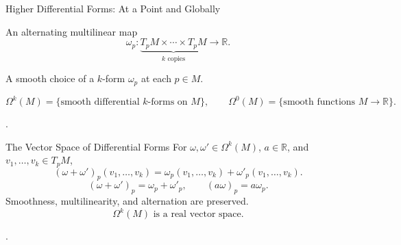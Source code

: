\documentclass[aspectratio=169,11pt]{beamer}
\newcommand{\sources}[1]{\par\vfill{\scriptsize\color{black!75}#1\par}}
\begin{document}
\begin{frame}{Higher Differential Forms: At a Point and Globally}
  \begin{definition}
    An alternating multilinear map
    \begin{equation}
      \omega_p\colon
      \underbrace{T_pM\times\cdots\times T_pM}_{k\text{ copies}}
      \longrightarrow\mathbb{R}.
    \end{equation}
  \end{definition}
  \begin{definition}
    A smooth choice of a $k$-form $\omega_p$ at each $p\in M$.
  \end{definition}
  \begin{equation}
    \Omega^k(M)=\{\text{smooth differential }k\text{-forms on }M\},
    \qquad \Omega^0(M)=\{\text{smooth functions }M\to\mathbb{R}\}.
  \end{equation}
  \sources{\cite[``Differential Forms on Manifolds,'' pp.~359--360]{lee2013smooth}.}
\end{frame}

\begin{frame}{The Vector Space of Differential Forms}
  For $\omega,\omega'\in\Omega^k(M)$, $a\in\mathbb{R}$, and
  $v_1,\ldots,v_k\in T_pM$,
  \begin{equation}
    (\omega+\omega')_p(v_1,\ldots,v_k)
    =\omega_p(v_1,\ldots,v_k)+\omega'_p(v_1,\ldots,v_k).
  \end{equation}
  \begin{equation}
    (\omega+\omega')_p=\omega_p+\omega'_p,
    \qquad (a\omega)_p=a\omega_p.
  \end{equation}
  Smoothness, multilinearity, and alternation are preserved.
  \begin{equation}
    \Omega^k(M)\text{ is a real vector space}.
  \end{equation}
  \sources{\cite[p.~360]{lee2013smooth}.}
\end{frame}
\end{document}
